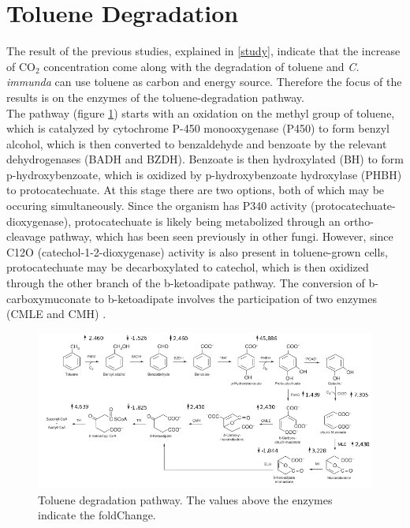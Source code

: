 \documentclass[12pt, a4paper]{report}
\begin{document}
\newpage
\section{Toluene Degradation}
The result of the previous studies, explained in \ref{study}, indicate that the increase of CO$_2$ concentration come along with the degradation of toluene and \textit{C. immunda} can use toluene as carbon and energy source. Therefore the focus of the results is on the enzymes of the toluene-degradation pathway.\\
The pathway (figure \ref{ToluendegUPDOWN}) starts with an oxidation on the methyl group of toluene, which is catalyzed by cytochrome P-450 monooxygenase (P450) to form benzyl alcohol, which is then converted to benzaldehyde and benzoate by the relevant dehydrogenases (BADH and BZDH). Benzoate is then hydroxylated (BH) to form p-hydroxybenzoate, which is oxidized by p-hydroxybenzoate hydroxylase (PHBH) to protocatechuate. At this stage there are two options, both of which may be occuring simultaneously. Since the organism has P340 activity (protocatechuate-dioxygenase), protocatechuate is likely being metabolized through an ortho-cleavage pathway, which has been seen previously in other fungi. However, since C12O (catechol-1-2-dioxygenase) activity is also present in toluene-grown cells, protocatechuate may be decarboxylated to catechol, which is then oxidized through the other branch of the b-ketoadipate pathway.  The conversion of b-carboxymuconate to b-ketoadipate involves the participation of two enzymes (CMLE and CMH) \cite{Parales2008}. \\

 \begin{figure}[H]
 	\centering	
 	\includegraphics[width=400pt]{pics/toldeg_UPDOWN.png}
 	\caption[Toluene degradation pathway]
 	{Toluene degradation pathway. The values above the enzymes indicate the foldChange.}
 	\label{ToluendegUPDOWN}
 \end{figure}
\end{document}
